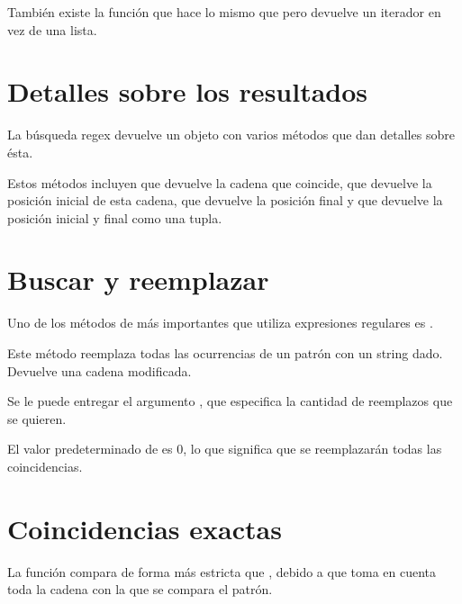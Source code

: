 También existe la función  que hace lo mismo que  pero devuelve un iterador en vez de una lista.


\section{Detalles sobre los resultados}

La búsqueda regex devuelve un objeto con varios métodos que dan detalles sobre ésta.

Estos métodos incluyen  que devuelve la cadena que coincide,  que devuelve la posición inicial de esta cadena,  que devuelve la posición final y  que devuelve la posición inicial y final como una tupla.


\section{Buscar y reemplazar}

Uno de los métodos de  más importantes que utiliza expresiones regulares es .

Este método reemplaza todas las ocurrencias de un patrón con un string dado.
Devuelve una cadena modificada.


Se le puede entregar el argumento , que especifica la cantidad de reemplazos que se quieren.


El valor predeterminado de  es 0, lo que significa que se reemplazarán todas las coincidencias.


\section{Coincidencias exactas}

La función  compara de forma más estricta que , debido a que toma en cuenta toda la cadena con la que se compara el patrón.

